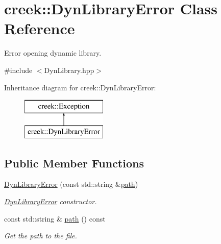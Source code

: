 \hypertarget{classcreek_1_1_dyn_library_error}{}\section{creek\+:\+:Dyn\+Library\+Error Class Reference}
\label{classcreek_1_1_dyn_library_error}


Error opening dynamic library.  




{\ttfamily \#include $<$Dyn\+Library.\+hpp$>$}

Inheritance diagram for creek\+:\+:Dyn\+Library\+Error\+:\begin{figure}[H]
\begin{center}
\leavevmode
\includegraphics[height=2.000000cm]{classcreek_1_1_dyn_library_error}
\end{center}
\end{figure}
\subsection*{Public Member Functions}
\begin{DoxyCompactItemize}
\item 
\hyperlink{classcreek_1_1_dyn_library_error_a0f131e4de4e1f80f7e90fdd42b283723}{Dyn\+Library\+Error} (const std\+::string \&\hyperlink{classcreek_1_1_dyn_library_error_a74b97a2d6b8263b82843bc65b6b0332a}{path})
\begin{DoxyCompactList}\small\item\em {\ttfamily \hyperlink{classcreek_1_1_dyn_library_error}{Dyn\+Library\+Error}} constructor. \end{DoxyCompactList}\item 
const std\+::string \& \hyperlink{classcreek_1_1_dyn_library_error_a74b97a2d6b8263b82843bc65b6b0332a}{path} () const \hypertarget{classcreek_1_1_dyn_library_error_a74b97a2d6b8263b82843bc65b6b0332a}{}\label{classcreek_1_1_dyn_library_error_a74b97a2d6b8263b82843bc65b6b0332a}

\begin{DoxyCompactList}\small\item\em Get the path to the file. \end{DoxyCompactList}\end{DoxyCompactItemize}
